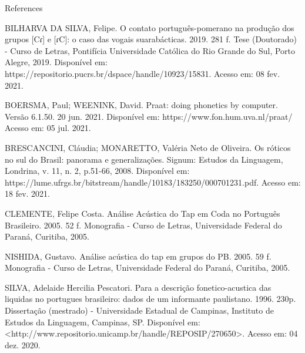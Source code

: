 \vspace{1ex}

References

BILHARVA DA SILVA, Felipe. O contato português-pomerano na produção dos grupos [Cɾ] e [ɾC]: o caso das vogais suarabácticas. 2019. 281 f. Tese (Doutorado) - Curso de Letras, Pontifícia Universidade Católica do Rio Grande do Sul, Porto Alegre, 2019. Disponível em: https://repositorio.pucrs.br/dspace/handle/10923/15831. Acesso em: 08 fev. 2021.

BOERSMA, Paul; WEENINK, David. Praat: doing phonetics by computer. Versão 6.1.50. 20 jun. 2021. Disponível em: https://www.fon.hum.uva.nl/praat/ Acesso em: 05 jul. 2021.

BRESCANCINI, Cláudia; MONARETTO, Valéria Neto de Oliveira. Os róticos no sul do Brasil: panorama e generalizações. Signum: Estudos da Linguagem, Londrina, v. 11, n. 2, p.51-66, 2008. Disponível em: https://lume.ufrgs.br/bitstream/handle/10183/183250/000701231.pdf. Acesso em: 18 fev. 2021.

CLEMENTE, Felipe Costa. Análise Acústica do Tap em Coda no Português Brasileiro. 2005. 52 f. Monografia - Curso de Letras, Universidade Federal do Paraná, Curitiba, 2005.

NISHIDA, Gustavo. Análise acústica do tap em grupos do PB. 2005. 59 f. Monografia - Curso de Letras, Universidade Federal do Paraná, Curitiba, 2005.

SILVA, Adelaide Hercilia Pescatori. Para a descrição fonetico-acustica das liquidas no portugues brasileiro: dados de um informante paulistano. 1996. 230p. Dissertação (mestrado) - Universidade Estadual de Campinas, Instituto de Estudos da Linguagem, Campinas, SP. Disponível em: <http://www.repositorio.unicamp.br/handle/REPOSIP/270650>. Acesso em: 04 dez. 2020.
